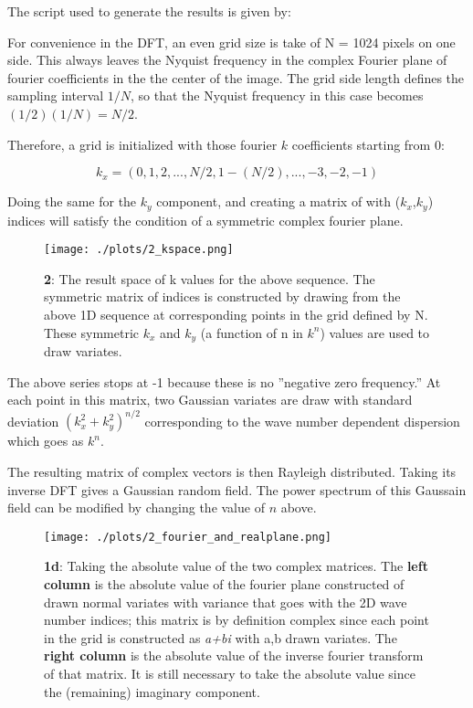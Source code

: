 The script used to generate the results is given by:




For convenience in the DFT, an even grid size is take of N = 1024 pixels on one side. This always leaves the Nyquist frequency in the complex Fourier plane of fourier coefficients in the the center of the image. The grid side length defines the sampling interval $1/N$, so that the Nyquist frequency in this case becomes $(1/2)(1/N) = N/2$.

Therefore, a grid is initialized with those fourier $k$ coefficients starting from 0:

\begin{equation}
    k_x=(0,1,2, ... , N/2, 1- (N/2), ... , -3,-2,-1)
\end{equation}

Doing the same for the $k_y$ component, and creating a matrix of with ($k_x$,$k_y$) indices will satisfy the condition of a symmetric complex fourier plane.

\begin{figure}[h!]
  \centering
  \texttt{[image: ./plots/2\_kspace.png]}
  \caption{\textbf{2}: The result space of k values for the above sequence. The symmetric matrix of indices is constructed by drawing from the above 1D sequence at corresponding points in the grid defined by N. These symmetric $k_x$ and $k_y$ (a function of n in $k^n$) values are used to draw variates.}
  \label{fig:kspace}
\end{figure}

The above series stops at -1 because these is no ''negative zero frequency.'' At each point in this matrix, two Gaussian variates are draw with standard deviation $(k_x^2+k_y^2)^{n/2}$ corresponding to the wave number dependent dispersion which goes as $k^n$.

The resulting matrix of complex vectors is then Rayleigh distributed. Taking its inverse DFT gives a Gaussian random field. The power spectrum of this Gaussain field can be modified by changing the value of $n$ above.

\begin{figure}[h!]
  \centering
  \texttt{[image: ./plots/2\_fourier\_and\_realplane.png]}
  \caption{\textbf{1d}: Taking the absolute value of the two complex matrices. The \textbf{left column} is the absolute value of the fourier plane constructed of drawn normal variates with variance that goes with the 2D wave number indices; this matrix is by definition complex since each point in the grid is constructed as \textit{a+bi} with a,b drawn variates. The \textbf{right column} is the absolute value of the inverse fourier transform of that matrix. It is still necessary to take the absolute value since the (remaining) imaginary component.}
  \label{fig:abs}
\end{figure}


